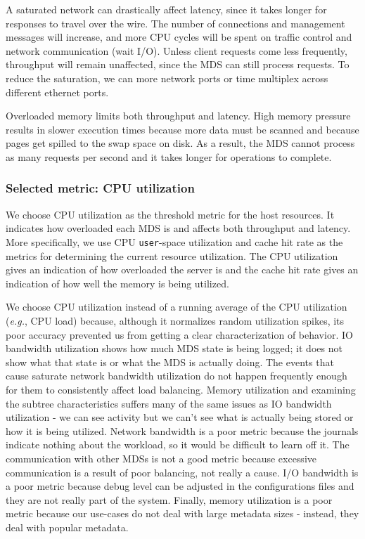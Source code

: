 A saturated network can drastically affect latency, since it takes longer for responses to travel over the wire. The number of connections and management messages will increase, and more CPU cycles will be spent on traffic control and network communication (wait I/O). Unless client requests come less frequently, throughput will remain unaffected, since the MDS can still process requests. To reduce the saturation, we can more network ports or time multiplex across different ethernet ports.

Overloaded memory limits both throughput and latency. High memory pressure results in slower execution times because more data must be scanned and because pages get spilled to the swap space on disk. As a result, the MDS cannot process as many requests per second and it takes longer for operations to complete. 

\subsubsection*{Selected metric: CPU utilization}
We choose CPU utilization as the threshold metric for the host resources. It indicates how overloaded each MDS is and affects both throughput and latency.  More specifically, we use CPU \texttt{user}-space utilization and cache hit rate as the metrics for determining the current resource utilization. The CPU utilization gives an indication of how overloaded the server is and the cache hit rate gives an indication of how well the memory is being utilized. 

We choose CPU utilization instead of a running average of the CPU utilization ({\it e.g.}, CPU load) because, although it normalizes random utilization spikes, its poor accuracy prevented us from getting a clear characterization of behavior. IO bandwidth utilization shows how much MDS state is being logged; it does not show what that state is or what the MDS is actually doing. The events that cause saturate network bandwidth utilization do not happen frequently enough for them to consistently affect load balancing. Memory utilization and examining the subtree characteristics suffers many of the same issues as IO bandwidth utilization - we can see activity but we can't see what is actually being stored or how it is being utilized. Network bandwidth is a poor metric because the journals indicate nothing about the workload, so it would be difficult to learn off it. The communication with other MDSs is not a good metric because excessive communication is a result of poor balancing, not really a cause. I/O bandwidth is a poor metric because debug level can be adjusted in the configurations files and they are not really part of the system. Finally, memory utilization is a poor metric because our use-cases do not deal with large metadata sizes - instead, they deal with popular metadata. 

